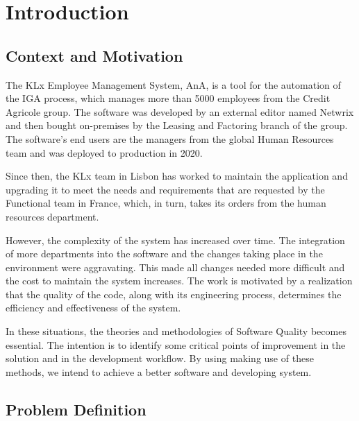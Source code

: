 
%

\chapter{Introduction}
\label{cha:introduction}


\section{Context and Motivation}
    
The KLx Employee Management System, AnA, is a tool for the automation of the IGA process, which manages more than 5000 employees from the Credit Agricole group. The software was developed by an external editor named Netwrix and then bought on-premises by the Leasing and Factoring branch of the group. The software's end users are the managers from the global Human Resources team and was deployed to production in 2020.

Since then, the KLx team in Lisbon has worked to maintain the application and upgrading it to meet the needs and requirements that are requested by the Functional team in France, which, in turn, takes its orders from the human resources department.

However, the complexity of the system has increased over time. The integration of more departments into the software and the changes taking place in the environment were aggravating. This made all changes needed more difficult and the cost to maintain the system increases. The work is motivated by a realization that the quality of the code, along with its engineering process, determines the efficiency and effectiveness of the system.

In these situations, the theories and methodologies of Software Quality becomes essential. The intention is to identify some critical points of improvement in the solution and in the development workflow. By using making use of these methods, we intend to achieve a better software and developing system.

\section{Problem Definition}


